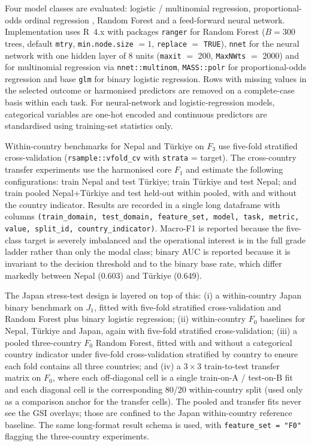 \documentclass[11pt,a4paper]{article}
\begin{document}
Four model classes are evaluated: logistic / multinomial regression, proportional-odds ordinal regression \citep{mccullagh1980regression}, Random Forest \citep{breiman2001randomforests} and a feed-forward neural network. Implementation uses R~4.x with packages \texttt{ranger} for Random Forest ($B = 300$ trees, default \texttt{mtry}, \texttt{min.node.size} $= 1$, \texttt{replace} $=$ \texttt{TRUE}), \texttt{nnet} for the neural network with one hidden layer of 8 units (\texttt{maxit} $=$ 200, \texttt{MaxNWts} $=$ 2000) and for multinomial regression via \texttt{nnet::multinom}, \texttt{MASS::polr} for proportional-odds regression and base \texttt{glm} for binary logistic regression. Rows with missing values in the selected outcome or harmonised predictors are removed on a complete-case basis within each task. For neural-network and logistic-regression models, categorical variables are one-hot encoded and continuous predictors are standardised using training-set statistics only.

Within-country benchmarks for Nepal and T\"urkiye on $F_3$ use five-fold stratified cross-validation (\texttt{rsample::vfold\_cv} with \texttt{strata} = target). The cross-country transfer experiments use the harmonised core $F_1$ and estimate the following configurations: train Nepal and test T\"urkiye; train T\"urkiye and test Nepal; and train pooled Nepal+T\"urkiye and test held-out within pooled, with and without the country indicator. Results are recorded in a single long dataframe with columns \texttt{(train\_domain, test\_domain, feature\_set, model, task, metric, value, split\_id, country\_indicator)}. Macro-F1 is reported because the five-class target is severely imbalanced and the operational interest is in the full grade ladder rather than only the modal class; binary AUC is reported because it is invariant to the decision threshold and to the binary base rate, which differ markedly between Nepal (0.603) and T\"urkiye (0.649).

The Japan stress-test design is layered on top of this: (i) a within-country Japan binary benchmark on $J_1$, fitted with five-fold stratified cross-validation and Random Forest plus binary logistic regression; (ii) within-country $F_0$ baselines for Nepal, T\"urkiye and Japan, again with five-fold stratified cross-validation; (iii) a pooled three-country $F_0$ Random Forest, fitted with and without a categorical country indicator under five-fold cross-validation stratified by country to ensure each fold contains all three countries; and (iv) a $3\times 3$ train-to-test transfer matrix on $F_0$, where each off-diagonal cell is a single train-on-A / test-on-B fit and each diagonal cell is the corresponding 80/20 within-country split (used only as a comparison anchor for the transfer cells). The pooled and transfer fits never see the GSI overlays; those are confined to the Japan within-country reference baseline. The same long-format result schema is used, with \texttt{feature\_set = "F0"} flagging the three-country experiments.
\end{document}
